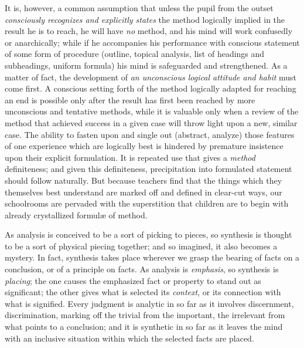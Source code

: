 \documentclass[showtrims,ustradepaper]{memoir}
\begin{document}

It is, however, a common assumption that unless the pupil from the
outset \emph{consciously recognizes and explicitly states} the method
logically implied in the result he is to reach, he will have \emph{no}
method, and his mind will work confusedly or anarchically; while if he
accompanies his performance with conscious statement of some form of
procedure (outline, topical analysis, list of headings and subheadings,
uniform formula) his mind is safeguarded and strengthened. As a matter
of fact, the development of \emph{an unconscious logical attitude and
habit} must come first. A conscious setting forth of the method
logically adapted for reaching an end is possible only after the result
has first been reached by more unconscious and tentative methods, while
it is valuable only when a review of the method that achieved success in
a given case will throw light upon a new, similar case. The ability to
fasten upon and single out (abstract, analyze) those features of one
experience which are logically best is hindered by premature insistence
upon their explicit formulation. It is repeated use that gives a
\emph{method} definiteness; and given this definiteness, precipitation
into formulated statement should follow naturally. But because teachers
find that the things which they themselves best understand are marked
off and defined in clear-cut ways, our schoolrooms are
pervaded
with the superstition that children are to begin with already
crystallized formulæ of method.


As analysis is conceived to be a sort of picking to pieces, so synthesis
is thought to be a sort of physical piecing together; and so imagined,
it also becomes a mystery. In fact, synthesis takes place wherever we
grasp the bearing of facts on a conclusion, or of a principle on facts.
As analysis is \emph{emphasis}, so synthesis is \emph{placing}; the one
causes the emphasized fact or property to stand out as significant; the
other gives what is selected its \emph{context}, or its connection with
what is signified. Every judgment is analytic in so far as it involves
discernment, discrimination, marking off the trivial from the important,
the irrelevant from what points to a conclusion; and it is synthetic in
so far as it leaves the mind with an inclusive situation within which
the selected facts are placed.
\end{document}
